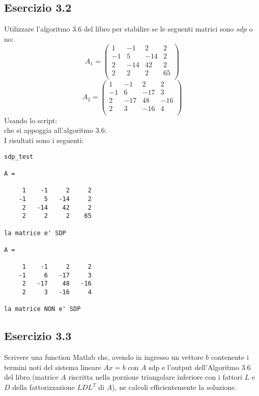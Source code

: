 	\subsection{Esercizio 3.2}

Utilizzare l'algoritmo 3.6 del libro per stabilire se le seguenti matrici sono $sdp$ o no:
	\[	
		A_1 = 
		\begin{pmatrix}
			1&-1&2&2 \\
			-1&5&-14&2\\
			2&-14&42&2\\
			2&2&2&65\\
		\end{pmatrix}
	\]
	\[		
		A_2 =
		\begin{pmatrix}
			1&-1&2&2\\
			-1&6&-17&3\\
			2&-17&48&-16\\
			2&3&-16&4\\
		\end{pmatrix}
	\]
\PP
Usando lo script: \\

che si appoggia all'algoritmo 3.6:\\

I risultati sono i seguenti:\\
\begin{lstlisting}[frame=single]
sdp_test

A =

     1    -1     2     2
    -1     5   -14     2
     2   -14    42     2
     2     2     2    65

la matrice e' SDP

A =

     1    -1     2     2
    -1     6   -17     3
     2   -17    48   -16
     2     3   -16     4

la matrice NON e' SDP
\end{lstlisting}



	\subsection{Esercizio 3.3}

Scrivere una function Matlab che, avendo in ingresso un vettore $b$ contenente i termini noti del sistema lineare $Ax = b$ con $A$ sdp e l’output dell’Algoritmo 3.6 del libro (matrice $A$ riscritta nella porzione triangolare inferiore con i fattori $L$ e $D$ della fattorizzazione $LDL^{T}$ di $A$), ne calcoli efficientemente la soluzione.
\PP




